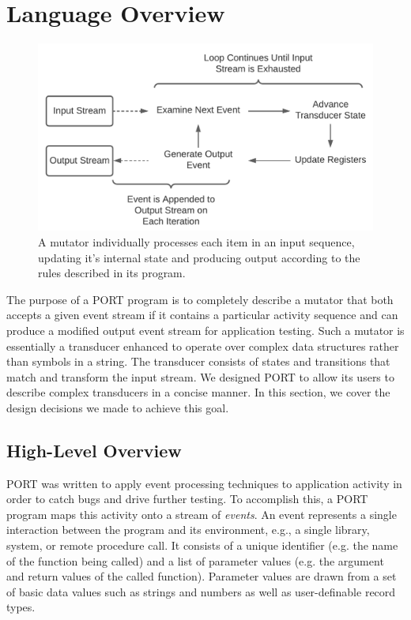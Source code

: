 \section{Language Overview}
\label{sec:Overview}

\begin{figure}[h]
  \centering
  \includegraphics[scale=.6]{images/processing}
  \caption{A mutator individually processes each item in an input
  sequence, updating it's internal state and producing output according
  to the rules described in its program.}
  \label{fig:Processing}
\end{figure}

The purpose
of a PORT program is to completely describe a mutator
that both
accepts a given event stream if it contains a particular
activity sequence and can produce a modified
output event stream
for application testing.
Such a mutator is essentially a
transducer enhanced to operate over complex data structures
rather than symbols in a string.
The transducer consists of states and transitions that match and transform the input stream.
We designed PORT to allow its users to
describe complex transducers in a concise manner.
In this section, we cover the design decisions we made
to achieve this goal.

\subsection{High-Level Overview}
\label{sub:ProcessingEventStreams}
PORT was written to apply event processing techniques to application activity in order to catch bugs and drive further testing.
To accomplish this, a PORT program maps this activity onto a
stream of \emph{events}. An event represents a single interaction between the program and its environment, e.g.,
a single library, system, or remote procedure call.
It consists of a unique identifier (e.g. the name of the function being called) and a list of parameter values (e.g. the argument and return values of the called function).
Parameter values are drawn from a set of basic data values such as strings and numbers as well as user-definable record types.

